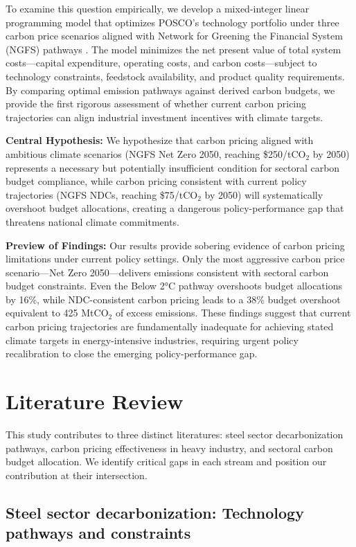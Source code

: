 \documentclass[preprint,1p,authoryear]{elsarticle}
\begin{document}
To examine this question empirically, we develop a mixed-integer linear programming model that optimizes POSCO's technology portfolio under three carbon price scenarios aligned with Network for Greening the Financial System (NGFS) pathways \citep{NGFS2024}. The model minimizes the net present value of total system costs—capital expenditure, operating costs, and carbon costs—subject to technology constraints, feedstock availability, and product quality requirements. By comparing optimal emission pathways against derived carbon budgets, we provide the first rigorous assessment of whether current carbon pricing trajectories can align industrial investment incentives with climate targets.

\textbf{Central Hypothesis:} We hypothesize that carbon pricing aligned with ambitious climate scenarios (NGFS Net Zero 2050, reaching \$250/tCO$_2$ by 2050) represents a necessary but potentially insufficient condition for sectoral carbon budget compliance, while carbon pricing consistent with current policy trajectories (NGFS NDCs, reaching \$75/tCO$_2$ by 2050) will systematically overshoot budget allocations, creating a dangerous policy-performance gap that threatens national climate commitments.

\textbf{Preview of Findings:} Our results provide sobering evidence of carbon pricing limitations under current policy settings. Only the most aggressive carbon price scenario—Net Zero 2050—delivers emissions consistent with sectoral carbon budget constraints. Even the Below 2°C pathway overshoots budget allocations by 16\%, while NDC-consistent carbon pricing leads to a 38\% budget overshoot equivalent to 425 MtCO$_2$ of excess emissions. These findings suggest that current carbon pricing trajectories are fundamentally inadequate for achieving stated climate targets in energy-intensive industries, requiring urgent policy recalibration to close the emerging policy-performance gap.

\section{Literature Review}

This study contributes to three distinct literatures: steel sector decarbonization pathways, carbon pricing effectiveness in heavy industry, and sectoral carbon budget allocation. We identify critical gaps in each stream and position our contribution at their intersection.

\subsection{Steel sector decarbonization: Technology pathways and constraints}
\end{document}
